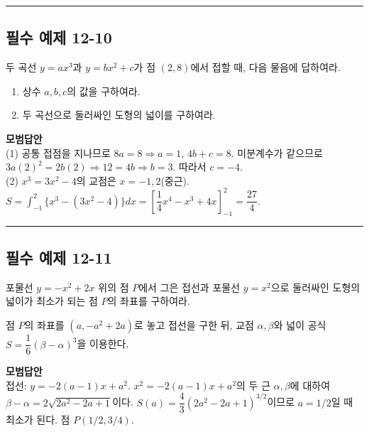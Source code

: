 \documentclass[a4paper,11pt]{article}
\begin{document}
\vspace{0.5cm}
\hrule
\vspace{0.5cm}

\subsection*{필수 예제 12-10}
두 곡선 $y=ax^3$과 $y=bx^2+c$가 점 $(2, 8)$에서 접할 때, 다음 물음에 답하여라.
\begin{enumerate}[label=(\arabic*)]
    \item 상수 $a, b, c$의 값을 구하여라.
    \item 두 곡선으로 둘러싸인 도형의 넓이를 구하여라.
\end{enumerate}

\textbf{모범답안}\\
(1) 공통 접점을 지나므로 $8a=8 \Rightarrow a=1$, $4b+c=8$. 미분계수가 같으므로 $3a(2)^2 = 2b(2) \Rightarrow 12=4b \Rightarrow b=3$. 따라서 $c=-4$.\\
(2) $x^3=3x^2-4$의 교점은 $x=-1, 2$(중근). $S = \int_{-1}^2 \{x^3-(3x^2-4)\} dx = \left[ \dfrac{1}{4}x^4 - x^3 + 4x \right]_{-1}^2 = \dfrac{27}{4}$.

\vspace{0.5cm}
\hrule
\vspace{0.5cm}

\subsection*{필수 예제 12-11}
포물선 $y=-x^2+2x$ 위의 점 $P$에서 그은 접선과 포물선 $y=x^2$으로 둘러싸인 도형의 넓이가 최소가 되는 점 $P$의 좌표를 구하여라.

\begin{studybox}
점 $P$의 좌표를 $(a, -a^2+2a)$로 놓고 접선을 구한 뒤, 교점 $\alpha, \beta$와 넓이 공식 $S = \dfrac{1}{6}(\beta-\alpha)^3$을 이용한다.
\end{studybox}

\textbf{모범답안}\\
접선: $y=-2(a-1)x+a^2$. $x^2 = -2(a-1)x+a^2$의 두 근 $\alpha, \beta$에 대하여 $\beta-\alpha = 2\sqrt{2a^2-2a+1}$이다. $S(a) = \dfrac{4}{3}(2a^2-2a+1)^{3/2}$이므로 $a=1/2$일 때 최소가 된다. 점 $P(1/2, 3/4)$.
\end{document}
